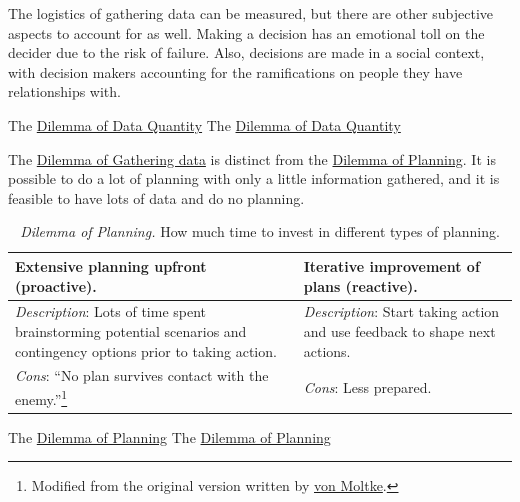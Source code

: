 The logistics of gathering data can be measured, but there are other subjective aspects to account for as well. Making a decision has an emotional toll on the decider due to the risk of failure. Also, decisions are made in a social context, with decision makers accounting for the ramifications on people they have relationships with. 

The \href{table:gather-data-lots-vs-little}{Dilemma of Data Quantity}
The \href{table:gather-data-lots-vs-little}{Dilemma of Data Quantity}


The \hyperref[table:gather-data-lots-vs-little]{Dilemma of Gathering data} is distinct from the \hyperref[table:planning]{Dilemma of Planning}. It is possible to do a lot of planning with only a little information gathered, and it is feasible to have lots of data and do no planning. 

\begin{center}
\begin{table}[H] %
\begin{tabular}{ | m{\dilemmatablewidth}| m{\dilemmatablewidth} | } 
  \hline
  \textbf{Extensive planning upfront (proactive).} & 
  \textbf{Iterative improvement of plans (reactive).} \\ 
  \hline
  \textit{Description}: Lots of time spent brainstorming potential scenarios and contingency options prior to taking action. & 
  \textit{Description}: Start taking action and use feedback to shape next actions. \\ 
  \hline
  \textit{Cons}: ``No plan survives contact with the enemy.''\footnote{Modified from the original version written by \href{https://en.wikipedia.org/wiki/Helmuth_von_Moltke_the_Elder}{von Moltke}.} & 
  \textit{Cons}: Less prepared. \\  
  \hline
\end{tabular}
\caption{
\textit{Dilemma of Planning.}
How much time to invest in different types of planning.
}
\label{table:planning}
\end{table}
\end{center}

The \href{table:planning}{Dilemma of Planning}
The \href{table:planning}{Dilemma of Planning}


